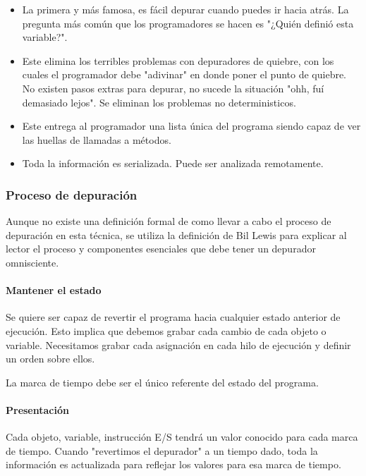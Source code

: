 \documentclass[12pt,legalpaper]{report}
\begin{document}
\begin{itemize}
	\item La primera y más famosa, es fácil depurar cuando puedes ir hacia atrás.  La pregunta más común que los programadores se hacen es "¿Quién definió esta variable?".

	\item Este elimina los terribles problemas con depuradores de quiebre, con los cuales el programador debe "adivinar" en donde poner el punto de quiebre.  No existen pasos extras para depurar, no sucede la situación "ohh, fuí demasiado lejos".  Se eliminan los problemas no deterministicos.

	\item Este entrega al programador una lista única del programa siendo capaz de ver las huellas de llamadas a métodos.

	\item Toda la información es serializada.  Puede ser analizada remotamente.
\end{itemize}

			\subsubsection{Proceso de depuración}

Aunque no existe una definición formal de como llevar a cabo el proceso de depuración en esta técnica, se utiliza la definición de Bil Lewis para explicar al lector el proceso y componentes esenciales que debe tener un depurador omnisciente.

				\paragraph{Mantener el estado}

Se quiere ser capaz de revertir el programa hacia cualquier estado anterior de ejecución.  Esto implica que debemos grabar cada cambio de cada objeto o variable.  Necesitamos grabar cada asignación en cada hilo de ejecución y definir un orden sobre ellos.

La marca de tiempo debe ser el único referente del estado del programa.

				\paragraph{Presentación}

Cada objeto, variable, instrucción E/S tendrá un valor conocido para cada marca de tiempo.  Cuando "revertimos el depurador" a un tiempo dado, toda la información es actualizada para reflejar los valores para esa marca de tiempo.
\end{document}
